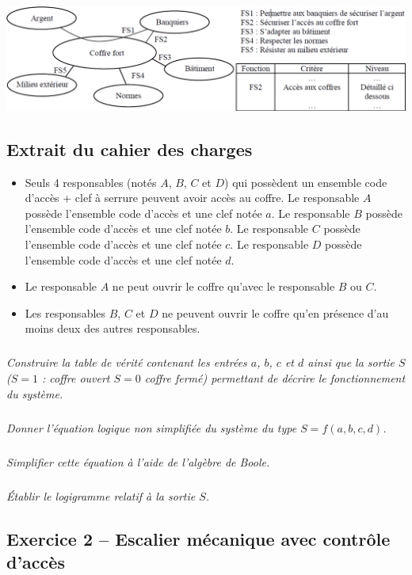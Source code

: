 \documentclass[10pt]{article}
\begin{document}
\begin{center}
\includegraphics[width=.9\textwidth]{png/fig4}
\end{center}

\subsection*{Extrait du cahier des charges}
\begin{itemize}
\item Seuls 4 responsables (notés $A$, $B$, $C$ et $D$) qui possèdent un ensemble code d'accès + clef à serrure peuvent avoir accès au coffre. Le responsable $A$ possède l'ensemble code d'accès et une clef notée $a$. Le responsable $B$ possède l'ensemble code d'accès et une clef notée $b$. Le responsable $C$ possède l'ensemble code d'accès et une clef notée $c$. Le responsable $D$ possède l'ensemble code d'accès et une clef notée $d$.
\item Le responsable $A$ ne peut ouvrir le coffre qu'avec le responsable $B$ ou $C$.
\item Les responsables $B$, $C$ et $D$ ne peuvent ouvrir le coffre qu'en présence d'au moins deux des autres responsables.
\end{itemize}

\subparagraph{}
\textit{Construire la table de vérité contenant les entrées $a$, $b$, $c$ et $d$ ainsi que la sortie $S$ ($S=1$ : coffre ouvert $S=0$ coffre fermé) permettant de décrire le fonctionnement du système.}

\subparagraph{}
\textit{Donner l'équation logique non simplifiée du système du type $S=f(a,b,c,d)$.}

\subparagraph{}
\textit{Simplifier cette équation à l'aide de l'algèbre de Boole.}
%

\subparagraph{}
\textit{Établir le logigramme relatif à la sortie $S$.}
%


\subsection*{Exercice 2 -- Escalier mécanique avec contrôle d'accès}
\end{document}
